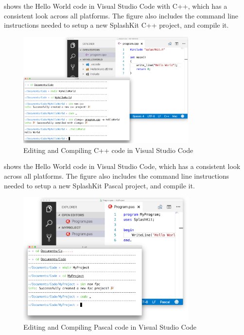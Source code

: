  shows the Hello World code in Visual Studio Code with C++, which has a consistent look across all platforms. The figure also includes the command line instructions needed to setup a new SplashKit C++ project, and compile it.

\begin{figure}[htbp]
   \centering
   \includegraphics[width=0.8\textwidth]{./topics/programs-and-compilers/images/CppExample} 
   \caption{Editing and Compiling C++ code in Visual Studio Code}
   \label{fig:cpp-example}
\end{figure}

 shows the Hello World code in Visual Studio Code, which has a consistent look across all platforms. The figure also includes the command line instructions needed to setup a new SplashKit Pascal project, and compile it.

\begin{figure}[htbp]
   \centering
   \includegraphics[width=0.8\textwidth]{./topics/programs-and-compilers/images/FpcExample} 
   \caption{Editing and Compiling Pascal code in Visual Studio Code}
   \label{fig:fpc-example}
\end{figure}

